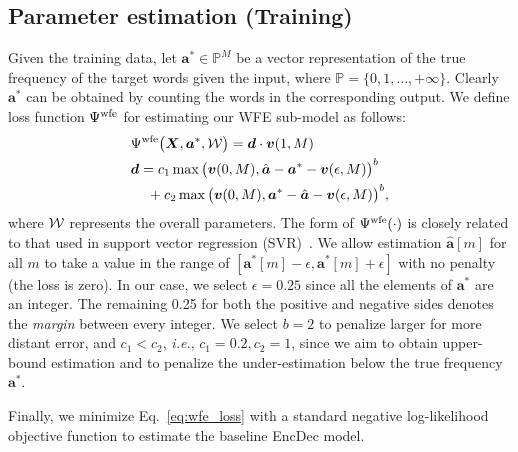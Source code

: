 \documentclass[11pt]{article}
\begin{document}
\subsection{Parameter estimation (Training)}
   Given the training data, let $\bm{a}^{*}\in \mathbb{P}^{M}$ be a vector representation of the true frequency of the target words given the input, where $\mathbb{P}=\{0,1,\dots,+\infty\}$. 
   Clearly $\bm{a}^{*}$ can be obtained by counting the words in the corresponding output.
   We define loss function $ \Psi^{\rm wfe }$ for estimating our WFE sub-model as follows:
\begin{align}
 &
 \displaystyle
 \Psi^{\rm wfe } 
 \big(  
 {\bm X},
 \bm{a}^{*}, 
 {\cal W}
 \big)   
 = \displaystyle
 \bm{d}\cdot \bm{v}(1,M)
 \label{eq:wfe_loss}
 \\
 &
 \bm{d}
 =
 c_1 \max\big(\bm{v}(0,M), 
 \hat{\bm{a}}
 -
 \bm{a}^{*} 
 - \bm{v}(\epsilon,M)
 \big)^{b}
 \nonumber\\
 &
\,\,\,\,\,\,\, +
 c_2\max\big(\bm{v}(0,M), 
 \bm{a}^{*} 
 -
 \hat{\bm{a}}
 - \bm{v}(\epsilon,M)
 \big)^{b}
 ,
 \nonumber
\end{align}
   where $ {\cal W}$ represents the overall parameters.
   The form of $\Psi^{\rm wfe}(\cdot)$ is closely related to that used in support vector regression (SVR)~\cite{smola2004tutorial}.
   We allow estimation $\hat{\bm{a}}[m]$ for all $m$ to take a value in the range of $[\bm{a}^{*}[m]-\epsilon, \bm{a}^{*}[m]+\epsilon]$ with no penalty (the loss is zero).
   In our case, we select $\epsilon=0.25$ since all the elements of $\bm{a}^{*}$ are an integer.
   The remaining 0.25 for both the positive and negative sides denotes the {\it margin} between every integer.
   We select $b=2$ to penalize larger for more distant error, and $c_1 \!<\! c_2$, {\it i.e.}, $c_1\!=\!0.2, c_2\!=\!1$, since we aim to obtain upper-bound estimation and to penalize the under-estimation below the true frequency $\bm{a}^*$.
   


   Finally, we minimize Eq.~\ref{eq:wfe_loss} with a standard negative log-likelihood objective function to estimate the baseline EncDec model.
\end{document}
